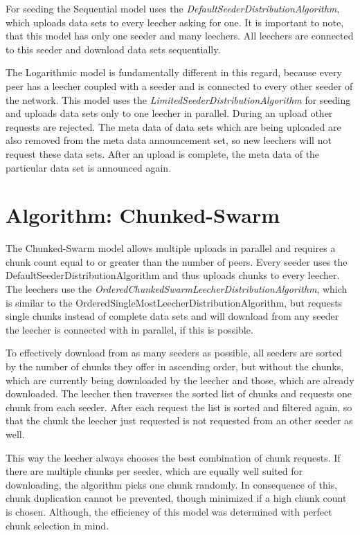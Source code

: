 For seeding the Sequential model uses the \emph{DefaultSeederDistributionAlgorithm}, which uploads data sets to every leecher asking for one. It is important to note, that this model has only one seeder and many leechers. All leechers are connected to this seeder and download data sets sequentially. 

The Logarithmic model is fundamentally different in this regard, because every peer has a leecher coupled with a seeder and is connected to every other seeder of the network. This model uses the \emph{LimitedSeederDistributionAlgorithm} for seeding and uploads data sets only to one leecher in parallel. During an upload other requests are rejected. The meta data of data sets which are being uploaded are also removed from the meta data announcement set, so new leechers will not request these data sets. After an upload is complete, the meta data of the particular data set is announced again.

\section{Algorithm: Chunked-Swarm}
\label{sec:chunkedswarm}
The Chunked-Swarm model allows multiple uploads in parallel and requires a chunk count equal to or greater than the number of peers. Every seeder uses the DefaultSeederDistributionAlgorithm and thus uploads chunks to every leecher. The leechers use the \emph{OrderedChunkedSwarmLeecherDistributionAlgorithm}, which is similar to the OrderedSingleMostLeecherDistributionAlgorithm, but requests single chunks instead of complete data sets and will download from any seeder the leecher is connected with in parallel, if this is possible. 

To effectively download from as many seeders as possible, all seeders are sorted by the number of chunks they offer in ascending order, but without the chunks, which are currently being downloaded by the leecher and those, which are already downloaded. The leecher then traverses the sorted list of chunks and requests one chunk from each seeder. After each request the list is sorted and filtered again, so that the chunk the leecher just requested is not requested from an other seeder as well. 

This way the leecher always chooses the best combination of chunk requests. If there are multiple chunks per seeder, which are equally well suited for downloading, the algorithm picks one chunk randomly. In consequence of this, chunk duplication cannot be prevented, though minimized if a high chunk count is chosen. Although, the efficiency of this model was determined with perfect chunk selection in mind. 

